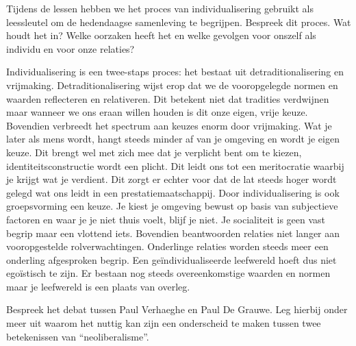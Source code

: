 \documentclass[main.tex]{subfiles}
\begin{document}
\begin{examenvraag}
    \begin{vraag}
        Tijdens de lessen hebben we het proces van individualisering gebruikt als leessleutel om de hedendaagse samenleving te begrijpen. Bespreek dit proces. Wat houdt het in? Welke oorzaken heeft het en welke gevolgen voor onszelf als individu en voor onze relaties?
    \end{vraag}

    \begin{antwoord}
    Individualisering is een twee-staps proces:‭ ‬het bestaat uit detraditionalisering en vrijmaking.‭ 
    Detraditionalisering wijst erop dat we de vooropgelegde normen en waarden reflecteren en 
    relativeren.‭ ‬Dit betekent niet dat tradities verdwijnen maar wanneer we ons eraan willen houden 
    is dit onze eigen,‭ ‬vrije keuze.‭ ‬Bovendien verbreedt het spectrum aan keuzes enorm door 
    vrijmaking.‭ ‬Wat je later als mens wordt,‭ ‬hangt steeds minder af van je omgeving en wordt je 
    eigen keuze.‭ ‬Dit brengt wel met zich mee dat je verplicht bent om te kiezen,‭ 
    ‬identiteitsconstructie wordt een plicht.‭ ‬Dit leidt ons tot een meritocratie waarbij je krijgt 
    wat je verdient.‭ ‬Dit zorgt er echter voor dat de lat steeds hoger wordt gelegd wat ons leidt in 
    een prestatiemaatschappij.‭ ‬Door individualisering is ook groepsvorming een‭ ‬keuze.‭ ‬Je kiest je 
    omgeving bewust op basis van subjectieve factoren en waar je je niet thuis voelt,‭ ‬blijf je 
    niet.‭ ‬Je socialiteit is geen vast begrip maar een vlottend iets.‭ ‬Bovendien beantwoorden 
    relaties niet langer aan vooropgestelde rolverwachtingen.‭ ‬Onderlinge relaties worden steeds 
    meer een onderling afgesproken begrip.‭ ‬Een geïndividualiseerde leefwereld hoeft dus niet 
    egoïstisch te zijn.‭ ‬Er bestaan nog steeds overeenkomstige waarden en normen maar je leefwereld 
    is een plaats van overleg.
    \end{antwoord}
\end{examenvraag}


\begin{examenvraag}
    \begin{vraag}
        Bespreek het debat tussen Paul Verhaeghe en Paul De Grauwe. Leg hierbij onder meer uit waarom het nuttig kan zijn een onderscheid te maken tussen twee betekenissen van “neoliberalisme”.
    \end{vraag}

    \begin{antwoord}
    \end{antwoord}
\end{examenvraag}
\end{document}

